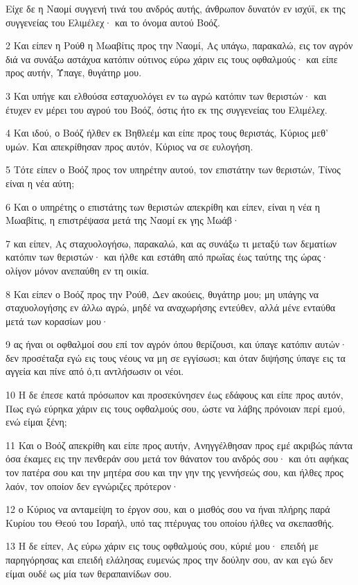 \par Είχε δε η Ναομί συγγενή τινά του ανδρός αυτής, άνθρωπον δυνατόν εν ισχύϊ, εκ της συγγενείας του Ελιμέλεχ· και το όνομα αυτού Βοόζ.
\par 2 Και είπεν η Ρούθ η Μωαβίτις προς την Ναομί, Ας υπάγω, παρακαλώ, εις τον αγρόν διά να συνάξω αστάχυα κατόπιν ούτινος εύρω χάριν εις τους οφθαλμούς· και είπε προς αυτήν, Ύπαγε, θυγάτηρ μου.
\par 3 Και υπήγε και ελθούσα εσταχυολόγει εν τω αγρώ κατόπιν των θεριστών· και έτυχεν εν μέρει του αγρού του Βοόζ, όστις ήτο εκ της συγγενείας του Ελιμέλεχ.
\par 4 Και ιδού, ο Βοόζ ήλθεν εκ Βηθλεέμ και είπε προς τους θεριστάς, Κύριος μεθ' υμών. Και απεκρίθησαν προς αυτόν, Κύριος να σε ευλογήση.
\par 5 Τότε είπεν ο Βοόζ προς τον υπηρέτην αυτού, τον επιστάτην των θεριστών, Τίνος είναι η νέα αύτη;
\par 6 Και ο υπηρέτης ο επιστάτης των θεριστών απεκρίθη και είπεν, είναι η νέα η Μωαβίτις, η επιστρέψασα μετά της Ναομί εκ γης Μωάβ·
\par 7 και είπεν, Ας σταχυολογήσω, παρακαλώ, και ας συνάξω τι μεταξύ των δεματίων κατόπιν των θεριστών· και ήλθε και εστάθη από πρωΐας έως ταύτης της ώρας· ολίγον μόνον ανεπαύθη εν τη οικία.
\par 8 Και είπεν ο Βοόζ προς την Ρούθ, Δεν ακούεις, θυγάτηρ μου; μη υπάγης να σταχυολογήσης εν άλλω αγρώ, μηδέ να αναχωρήσης εντεύθεν, αλλά μένε ενταύθα μετά των κορασίων μου·
\par 9 ας ήναι οι οφθαλμοί σου επί τον αγρόν όπου θερίζουσι, και ύπαγε κατόπιν αυτών· δεν προσέταξα εγώ εις τους νέους να μη σε εγγίσωσι; και όταν διψήσης ύπαγε εις τα αγγεία και πίνε από ό,τι αντλήσωσιν οι νέοι.
\par 10 Η δε έπεσε κατά πρόσωπον και προσεκύνησεν έως εδάφους και είπε προς αυτόν, Πως εγώ εύρηκα χάριν εις τους οφθαλμούς σου, ώστε να λάβης πρόνοιαν περί εμού, ενώ είμαι ξένη;
\par 11 Και ο Βοόζ απεκρίθη και είπε προς αυτήν, Ανηγγέλθησαν προς εμέ ακριβώς πάντα όσα έκαμες εις την πενθεράν σου μετά τον θάνατον του ανδρός σου· και ότι αφήκας τον πατέρα σου και την μητέρα σου και την γην της γεννήσεώς σου, και ήλθες προς λαόν, τον οποίον δεν εγνώριζες πρότερον·
\par 12 ο Κύριος να ανταμείψη το έργον σου, και ο μισθός σου να ήναι πλήρης παρά Κυρίου του Θεού του Ισραήλ, υπό τας πτέρυγας του οποίου ήλθες να σκεπασθής.
\par 13 Η δε είπεν, Ας εύρω χάριν εις τους οφθαλμούς σου, κύριέ μου· επειδή με παρηγόρησας και επειδή ελάλησας ευμενώς προς την δούλην σου, αν και εγώ δεν είμαι ουδέ ως μία των θεραπαινίδων σου.
